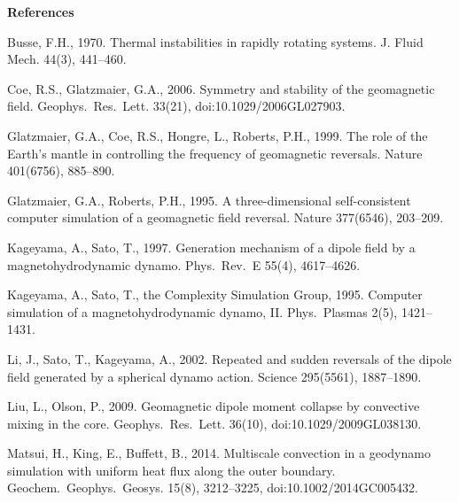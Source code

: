 \noindent
{\bf References}
%
\begin{list}
{}{
\setlength{\parsep}{0pt}
\setlength{\itemsep}{0pt}
\setlength{\leftmargin}{1.0em}
\setlength{\itemindent}{-\leftmargin}
}
\item
Busse, F.H., 1970. Thermal instabilities in rapidly rotating systems. J. Fluid Mech. 44(3), 441--460.
\item
Coe, R.S., Glatzmaier, G.A., 2006. Symmetry and stability of the geomagnetic field. Geophys.\ Res.\ Lett. 33(21), doi:10.1029/2006GL027903.
%
\item
Glatzmaier, G.A., Coe, R.S., Hongre, L., Roberts, P.H., 1999. The role of the Earth's mantle in controlling the frequency of geomagnetic reversals. Nature 401(6756), 885--890.
%
\item
Glatzmaier, G.A., Roberts, P.H., 1995. A three-dimensional self-consistent computer simulation of a geomagnetic field reversal. Nature 377(6546), 203--209.
%
\item
Kageyama, A., Sato, T., 1997. Generation mechanism of a dipole field by a magnetohydrodynamic dynamo. Phys.\ Rev.\ E 55(4), 4617--4626.
%
\item
Kageyama, A., Sato, T., the Complexity Simulation Group, 1995. Computer simulation of a magnetohydrodynamic dynamo, II. Phys.\ Plasmas 2(5), 1421--1431.
%
\item
Li, J., Sato, T., Kageyama, A., 2002. Repeated and sudden reversals of the dipole field generated by a spherical dynamo action. Science 295(5561), 1887--1890.
%
\item
Liu, L., Olson, P., 2009. Geomagnetic dipole moment collapse by convective mixing in the core. Geophys.\ Res.\ Lett. 36(10), doi:10.1029/2009GL038130.
%
\item
Matsui, H., King, E., Buffett, B., 2014. Multiscale convection in a geodynamo simulation with uniform heat flux along the outer boundary. Geochem.\ Geophys.\ Geosys. 15(8), 3212--3225, doi:10.1002/2014GC005432.

\end{list}
